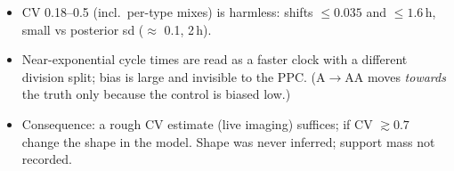\documentclass[10pt,a4paper]{article}
\newcommand{\blk}[1]{\par\needspace{5\baselineskip}\smallskip{\sffamily\bfseries\color{inkgray}#1}\par}
\newcommand{\Comment}{\blk{Comment}}
\begin{document}
\Comment
\begin{itemize}
\item CV 0.18--0.5 (incl.\ per-type mixes) is harmless: shifts $\le 0.035$ and $\le 1.6$\,h, small vs posterior sd ($\approx$ 0.1, 2\,h).
\item Near-exponential cycle times are read as a faster clock with a different division split; bias is large and invisible to the PPC. (A$\to$AA moves \emph{towards} the truth only because the control is biased low.)
\item Consequence: a rough CV estimate (live imaging) suffices; if CV $\gtrsim 0.7$ change the shape in the model. Shape was never inferred; support mass not recorded.
\end{itemize}

\end{document}

